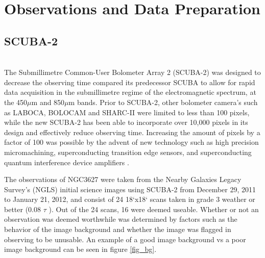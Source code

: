 \chapter{Observations and Data Preparation}\label{observations}

\section{SCUBA-2} \\
The Submillimetre Common-User Bolometer Array 2 (SCUBA-2) was designed to decrease the observing time compared its predecessor SCUBA to allow for rapid data acquisition in the submillimetre regime of the electromagnetic spectrum, at the 450$\mu$m and 850$\mu$m bands.  Prior to SCUBA-2, other bolometer camera's such as LABOCA, BOLOCAM and SHARC-II were limited to less than 100 pixels, while the new SCUBA-2 has been able to incorporate over 10,000 pixels in its design and effectively reduce observing time.  Increasing the amount of pixels by a factor of 100 was possible by the advent of new technology such as high precision micromachining, superconducting transition edge sensors, and superconducting quantum interference device amplifiers \citet{holland2013}.

The observations of NGC3627 were taken from the Nearby Galaxies Legacy Survey's (NGLS) initial science images using SCUBA-2 from December 29, 2011  to January 21, 2012, and consist of 24 18`x18` scans taken in grade 3 weather or better (0.08 \< $\tau$ ).  Out of the 24 scans, 16 were deemed useable.  Whether or not an observation was deemed worthwhile was determined by factors such as the behavior of the image background and whether the image was flagged in observing to be unusable.  An example of a good image background vs a poor image background can be seen in figure \ref{fig_bg}.  


